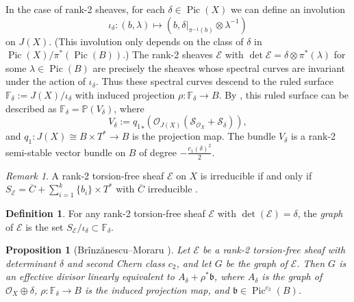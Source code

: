 \documentclass{article}[12pt]
\newtheorem{proposition}[theorem]{Proposition}
\theoremstyle{definition}
\newtheorem{definition}[theorem]{Definition}
\theoremstyle{remark}
\newtheorem{remark}[theorem]{Remark}
\numberwithin{equation}{section}
\newcommand \mc{\mathcal}
\newcommand \mb{\mathbb}
\newcommand \mf{\mathfrak}
\DeclareMathOperator{\Pic}{Pic}
\begin{document}
In the case of rank-2 sheaves, for each $\delta \in \Pic(X)$ we can define an involution $$\iota_\delta: (b,\lambda) \mapsto (b,\delta|_{\pi^{-1}(b)}\otimes \lambda^{-1})$$ on $J(X)$. (This involution only depends on the class of $\delta$ in $\Pic(X)/\pi^*(\Pic(B))$.) The rank-2 sheaves $\mc{E}$ with $\det{\mc{E}}=\delta\otimes \pi^*(\lambda)$ for some $\lambda \in \Pic(B)$ are precisely the sheaves whose spectral curves are invariant under the action of $\iota_\delta$. Thus these spectral curves descend to the ruled surface $\mb{F}_\delta:=J(X)/\iota_\delta$ with induced projection $\rho:\mb{F}_\delta\to B$. By \cite{BrMor}, this ruled surface can be described as $\mb{F}_\delta=\mb{P}(V_\delta)$, where $$V_\delta:={q_1}_*\left(\mc{O}_{J(X)}\left(\mc{S}_{\mc{O}_X}+\mc{S}_\delta\right)\right),$$
and $q_1:J(X)\cong B\times T^*\to B$ is the projection map. The bundle $V_\delta$ is a rank-2 semi-stable vector bundle on $B$ of degree $-\frac{c_1(\delta)^2}{2}$\cite[Lemma 3.8]{BrMor}.
\begin{remark}
	A rank-2 torsion-free sheaf $\mc{E}$ on $X$ is irreducible if and only if $S_\mc{E}=\overline{C}+\sum\limits_{i=1}^k \{b_i\}\times T^*$ with $\overline{C}$ irreducible \cite{BrMor}.
\end{remark}
\begin{definition}
	For any rank-2 torsion-free sheaf $\mc{E}$ with $\det(\mc{E})=\delta$, the \emph{graph} of $\mc{E}$ is the set $S_\mc{E}/\iota_\delta \subset \mb{F}_\delta$.
\end{definition}
\begin{proposition}[Br\^inz\u anescu--Moraru \cite{BrMor}]
	Let $\mc{E}$ be a rank-2 torsion-free sheaf with determinant $\delta$ and second Chern class $c_2$, and let $G$ be the graph of $\mc{E}$. Then $G$ is an effective divisor linearly equivalent to $A_\delta+\rho^*\mf{b}$, where $A_\delta$ is the graph of $\mc{O}_X\oplus \delta$, $\rho:\mb{F}_\delta\to B$ is the induced projection map, and $\mf{b} \in \Pic^{c_2}(B)$.
\end{proposition}
\end{document}
